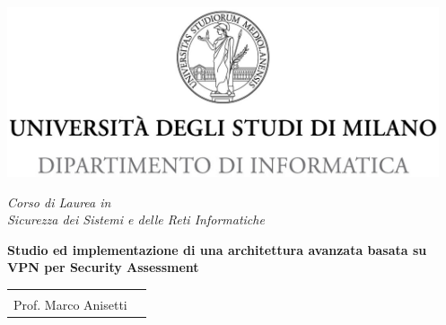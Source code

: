 \documentclass[12pt,fleqn,twoside,a4paper]{book}
\begin{document}

\begin{titlepage}
  \begin{center}
    \includegraphics[height=5.0cm]{img/minerva_2013_DI.jpg}

    \vspace*{.4cm}
    {\Large
      \emph{Corso di Laurea in\\[.3cm]
        Sicurezza dei Sistemi e delle Reti Informatiche}
    }
    \vfill
    \begin{LARGE}


      \textbf{Studio ed implementazione di una%
      \vspace{0.2cm}
        architettura avanzata basata su VPN%
        \vspace{0.2cm}
        per Security Assessment}
    \end{LARGE}

    \vfill
    \begin{minipage}{.99\linewidth}
      \begin{tabular}{l r}
        \begin{minipage}[t]{.4\linewidth}
          \begin{flushleft}
            {\large
              RELATORE\\[.3cm]
              Prof. Marco Anisetti
            }


\end{flushleft}
\end{minipage}
\end{tabular}
\end{minipage}
\end{center}
\end{titlepage}
\end{document}
